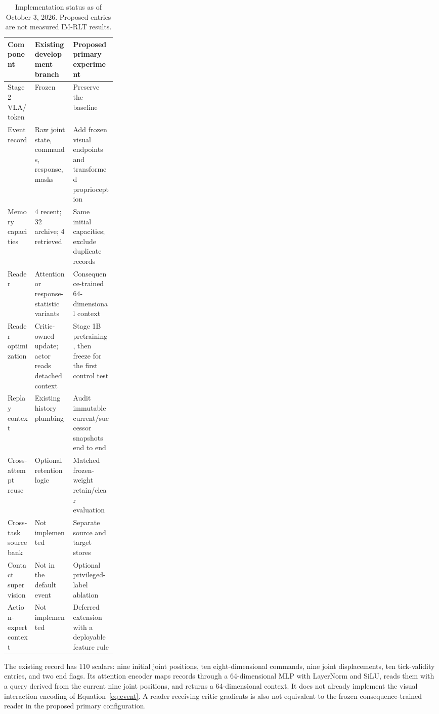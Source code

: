 \documentclass[10pt,letterpaper]{article}
\begin{document}
\begin{table}[h]
\centering\small
\caption{Implementation status as of October 3, 2026. Proposed entries are not measured IM-RLT results.}
\label{tab:status}
\begin{tabularx}{\linewidth}{@{}p{0.25\linewidth}YY@{}}
\toprule
Component & Existing development branch & Proposed primary experiment \\
\midrule
Stage 2 VLA/token & Frozen & Preserve the baseline \\
Event record & Raw joint state, commands, response, masks & Add frozen visual endpoints and transformed proprioception \\
Memory capacities & 4 recent; 32 archive; 4 retrieved & Same initial capacities; exclude duplicate records \\
Reader & Attention or response-statistic variants & Consequence-trained 64-dimensional context \\
Reader optimization & Critic-owned update; actor reads detached context & Stage 1B pretraining, then freeze for the first control test \\
Replay context & Existing history plumbing & Audit immutable current/successor snapshots end to end \\
Cross-attempt reuse & Optional retention logic & Matched frozen-weight retain/clear evaluation \\
Cross-task source bank & Not implemented & Separate source and target stores \\
Contact supervision & Not in the default event & Optional privileged-label ablation \\
Action-expert context & Not implemented & Deferred extension with a deployable feature rule \\
\bottomrule
\end{tabularx}
\end{table}

The existing record has 110 scalars: nine initial joint positions, ten eight-dimensional commands, nine joint displacements, ten tick-validity entries, and two end flags. Its attention encoder maps records through a 64-dimensional MLP with LayerNorm and SiLU, reads them with a query derived from the current nine joint positions, and returns a 64-dimensional context. It does not already implement the visual interaction encoding of Equation~\ref{eq:event}. A reader receiving critic gradients is also not equivalent to the frozen consequence-trained reader in the proposed primary configuration.
\end{document}
